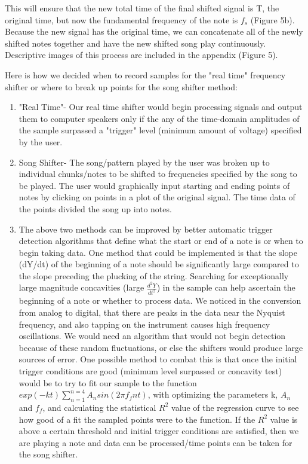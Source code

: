 \documentclass{article}
\begin{document}
\begin{enumerate}
This will ensure that the new total time of the final shifted signal is T, the original time, but now the fundamental frequency of the note is $f_s$ (Figure 5b). Because the new signal has the original time, we can concatenate all of the newly shifted notes together and have the new shifted song play continuously. Descriptive images of this process are included in the appendix (Figure 5).
            \cite{wiki3}
            \cite{phase}
        \end{enumerate}
        Here is how we decided when to record samples for the "real time" frequency shifter or where to break up points for the song shifter method:
        \begin{enumerate}
            \item "Real Time"- Our real time shifter would begin processing signals and output them to computer speakers only if the any of the time-domain amplitudes of the sample surpassed a "trigger" level (minimum amount of voltage) specified by the user.
            \item Song Shifter- The song/pattern played by the user was broken up to individual chunks/notes to be shifted to frequencies specified by the song to be played. The user would graphically input starting and ending points of notes by clicking on points in a plot of the original signal. The time data of the points divided the song up into notes.
            \item The above two methods can be improved by better automatic trigger detection algorithms that define what the start or end of a note is or when to begin taking data. One method that could be implemented is that the slope (dY/dt) of the beginning of a note should be significantly large compared to the slope preceding the plucking of the string. Searching for exceptionally large magnitude concavities (large $\frac{d^2Y}{dt^2}$) in the sample can help ascertain the beginning of a note or whether to process data. We noticed in the conversion from analog to digital, that there are peaks in the data near the Nyquist frequency, and also tapping on the instrument causes high frequency oscillations. We would need an algorithm that would not begin detection because of these random fluctuations, or else the shifters would produce large sources of error. One possible method to combat this is that once the initial trigger conditions are good (minimum level surpassed or concavity test) would be to try to fit our sample to the function $exp(-kt)\sum_{n=1}^{n=4} A_n sin(2\pi f_f nt)$, with optimizing the parameters k, $A_n$ and $f_f$, and calculating the statistical $R^2$ value of the regression curve to see how good of a fit the sampled points were to the function. If the $R^2$ value is above a certain threshold and initial trigger conditions are satisfied, then we are playing a note and data can be processed/time points can be taken for the song shifter.
        \end{enumerate}
\end{document}
